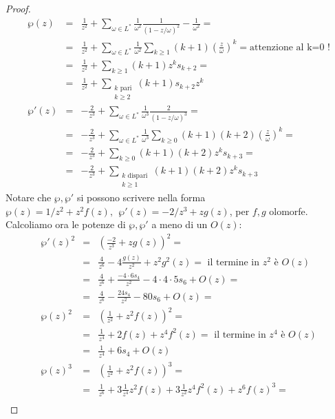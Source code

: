 \begin{proof}
\begin{eqnarray*}
\wp(z) & = & \frac{1}{z^2} + \sum_{\omega \in L^*} \frac{1}{\omega^2} \frac{1}{(1-z/\omega)^2} - \frac{1}{\omega^2} = \\
       & = & \frac{1}{z^2} + \sum_{\omega \in L^*} \frac{1}{\omega^2} \sum_{k \ge 1} (k+1) \left ( \frac{z}{\omega} \right ) ^k =  \text{attenzione al k=0 !}\\
       & = & \frac{1}{z^2} + \sum_{k \ge 1} (k+1) z^k s_{k+2} = \\
       & = & \frac{1}{z^2} + \sum_{\substack{k \text{ pari} \\ k \ge 2}} (k+1)s_{k+2} z^k \\
\wp'(z)& = & -\frac{2}{z^3}+ \sum_{\omega \in L^*} \frac{1}{\omega^3} \frac{2}{(1-z/\omega)^3}= \\
       & = & -\frac{2}{z^3}+ \sum_{\omega \in L^*} \frac{1}{\omega^3} \sum_{k \ge 0} (k+1)(k+2) \left ( \frac{z}{\omega} \right ) ^k =\\
       & = & -\frac{2}{z^3} + \sum_{k \ge 0} (k+1)(k+2) z^k s_{k+3} =\\
       & = & -\frac{2}{z^3} + \sum_{\substack{k \text{ dispari} \\ k \ge 1}} (k+1)(k+2) z^k s_{k+3}
\end{eqnarray*}
Notare che $\wp, \wp'$ si possono scrivere nella forma $\wp(z) = 1/z^2 + z^2 f(z), \ \ \wp'(z) = -2/z^3 + zg(z)$, per $f,g$ olomorfe. Calcoliamo ora le potenze di $\wp, \wp'$ a meno di un $O(z)$:
\begin{eqnarray*}
\wp'(z)^2 & = & \left ( \frac{-2}{z^3} + zg(z) \right )^2 = \\
          & = & \frac{4}{z^6} -4\frac{g(z)}{z^2} + z^2g^2(z) = \text{ il termine in } z^2 \text{ è } O(z)\\
          & = & \frac{4}{z^6} +\frac{-4 \cdot 6s_4 }{z^2} -4 \cdot 4 \cdot 5 s_6 + O(z) = \\
          & = & \frac{4}{z^6} - \frac{24s_4 }{z^2} -80s_6 + O(z) = \\
\wp(z)^2  & = & \left ( \frac{1}{z^2} + z^2f(z) \right )^2 = \\
          & = & \frac{1}{z^4} +2f(z) + z^4f^2(z) = \text{ il termine in } z^4 \text{ è } O(z)\\
          & = & \frac{1}{z^4} + 6s_4 + O(z) \\
\wp(z)^3  & = & \left ( \frac{1}{z^2} + z^2f(z) \right )^3 = \\
          & = & \frac{1}{z^6} +3\frac{1}{z^4}z^2f(z) + 3 \frac{1}{z^2} z^4 f^2(z) + z^6f(z)^3 = \\

\end{eqnarray*}
\end{proof}
